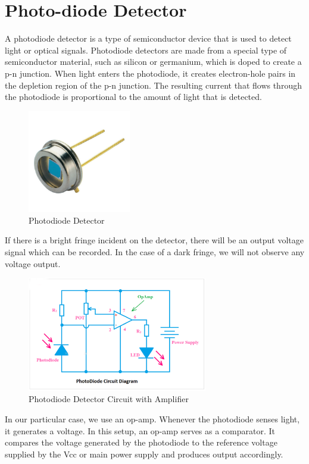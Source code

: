\section{Photo-diode Detector}
A photodiode detector is a type of semiconductor device that is used to detect light or optical signals. Photodiode detectors are made from a special type of semiconductor material, such as silicon or germanium, which is doped to create a p-n junction. When light enters the photodiode, it creates electron-hole pairs in the depletion region of the p-n junction. The resulting current that flows through the photodiode is proportional to the amount of light that is detected.
\begin{figure}[H]
	\centering
	\includegraphics[width=0.4\textwidth]{photo.jpg}
	\caption{Photodiode Detector}
	\label{fig:flow around cylinder}
\end{figure}
If there is a bright fringe incident on the detector, there will be an output voltage signal which can be recorded. In the case of a dark fringe, we will not observe any voltage output. 
\begin{figure}[H]
	\centering
	\includegraphics[width=0.7\textwidth]{photcircuit.png}
	\caption{Photodiode Detector Circuit with Amplifier}
	\label{fig:flow around cylinder}
\end{figure}
In our particular case, we use an op-amp. Whenever the photodiode senses light, it generates a voltage. In this setup, an op-amp serves as a comparator. It compares the voltage generated by the photodiode to the reference voltage supplied by the Vcc or main power supply and produces output accordingly.
\setcounter{equation}{0}
\setcounter{table}{0}
\setcounter{figure}{0}


    



